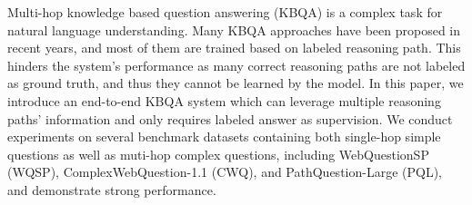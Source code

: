  Multi-hop knowledge based question answering (KBQA) is a complex task for natural language understanding. Many KBQA approaches have been proposed in recent years, and most of them are trained based on labeled reasoning path. This hinders the system's performance as many correct reasoning paths are not labeled as ground truth, and thus they cannot be learned by the model. In this paper, we introduce an end-to-end KBQA system which can leverage multiple reasoning paths' information and only requires labeled answer as supervision. We conduct experiments on several benchmark datasets containing both single-hop simple questions as well as muti-hop complex questions, including WebQuestionSP (WQSP), ComplexWebQuestion-1.1 (CWQ), and PathQuestion-Large (PQL), and demonstrate strong performance.